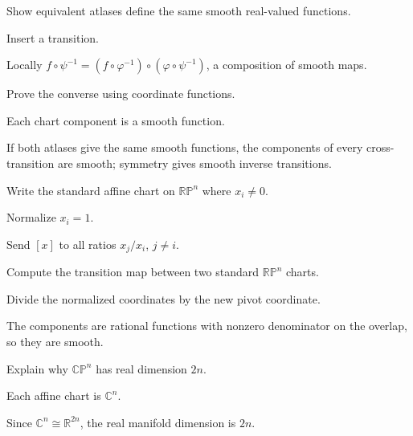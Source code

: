 \begin{exercise}\label{exr:vii02-10}
Show equivalent atlases define the same smooth real-valued functions.
\end{exercise}
\begin{hint}
Insert a transition.
\end{hint}
\begin{solution}
Locally \(f\circ\psi^{-1}=(f\circ\varphi^{-1})\circ(\varphi\circ\psi^{-1})\), a composition of smooth maps.
\end{solution}

\begin{exercise}\label{exr:vii02-11}
Prove the converse using coordinate functions.
\end{exercise}
\begin{hint}
Each chart component is a smooth function.
\end{hint}
\begin{solution}
If both atlases give the same smooth functions, the components of every cross-transition are smooth; symmetry gives smooth inverse transitions.
\end{solution}

\begin{exercise}\label{exr:vii02-12}
Write the standard affine chart on \(\mathbb{RP}^n\) where \(x_i\neq0\).
\end{exercise}
\begin{hint}
Normalize \(x_i=1\).
\end{hint}
\begin{solution}
Send \([x]\) to all ratios \(x_j/x_i\), \(j\neq i\).
\end{solution}

\begin{exercise}\label{exr:vii02-13}
Compute the transition map between two standard \(\mathbb{RP}^n\) charts.
\end{exercise}
\begin{hint}
Divide the normalized coordinates by the new pivot coordinate.
\end{hint}
\begin{solution}
The components are rational functions with nonzero denominator on the overlap, so they are smooth.
\end{solution}

\begin{exercise}\label{exr:vii02-14}
Explain why \(\mathbb{CP}^n\) has real dimension \(2n\).
\end{exercise}
\begin{hint}
Each affine chart is \(\mathbb C^n\).
\end{hint}
\begin{solution}
Since \(\mathbb C^n\cong\mathbb R^{2n}\), the real manifold dimension is \(2n\).
\end{solution}

